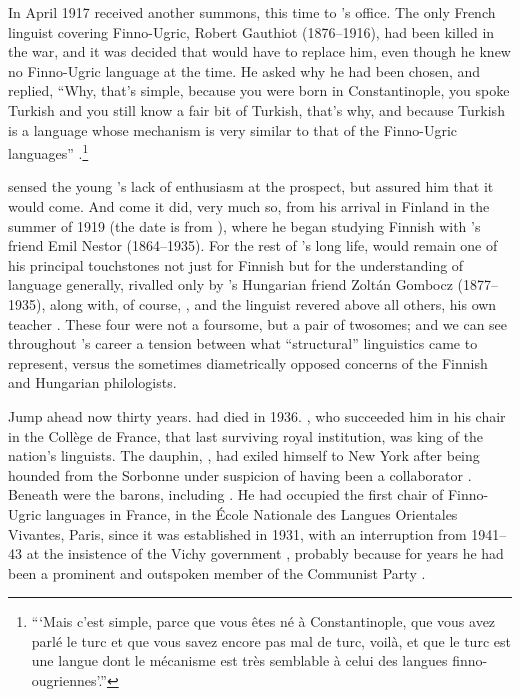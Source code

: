 \documentclass[output=paper]{langscibook}
\begin{document}
In April 1917 {\Sauvageot} received another summons, this time to {\Meillet}'s office. The only French linguist covering Finno-Ugric, Robert Gauthiot (1876--1916), had been killed in the war, and it was decided that {\Sauvageot} would have to replace him, even though he knew no Finno-Ugric language at the time. He asked why he had been chosen, and {\Meillet} replied, ``Why, that's simple, because you were born in Constantinople, you spoke Turkish and you still know a fair bit of Turkish, that's why, and because Turkish is a language whose mechanism is very similar to that of the Finno-Ugric languages'' \citep[194]{Sauvageot1992}.\footnote{```Mais c'est simple, parce que vous êtes né à Constantinople, que vous avez parlé le turc et que vous savez encore pas mal de turc, voilà, et que le turc est une langue dont le mécanisme est très semblable à celui des langues finno-ougriennes'.''}

{\Meillet} sensed the young {\Sauvageot}'s lack of enthusiasm at the prospect, but assured him that it would come. And come it did, very much so, from his arrival in Finland in the summer of 1919 (the date is from \citealt[296]{Perrot2007}), where he began studying Finnish with {\Meillet}'s friend Emil Nestor {} (1864--1935). For the rest of {\Sauvageot}'s long life, {} would remain one of his principal touchstones not just for Finnish but for the understanding of language generally, rivalled only by {}'s Hungarian friend Zoltán Gombocz (1877--1935), along with, of course, {\Meillet}, and the linguist {\Meillet} revered above all others, his own teacher {\Saussure}. These four were not a foursome, but a pair of twosomes; and we can see throughout {\Sauvageot}'s career a tension between what ``structural'' linguistics came to represent, versus the sometimes diametrically opposed concerns of the Finnish and Hungarian philologists.

Jump ahead now thirty years. {\Meillet} had died in 1936. {\Benveniste}, who succeeded him in his chair in the Collège de France, that last surviving royal institution, was king of the nation's linguists. The dauphin, {\Martinet}, had exiled himself to New York after being hounded from the Sorbonne under suspicion of having been a collaborator \citep[see][]{Joseph2016}. Beneath {\Benveniste} were the barons, including {\Sauvageot}. He had occupied the first chair of Finno-Ugric languages in France, in the École Nationale des Langues Orientales Vivantes, Paris, since it was established in 1931, with an interruption from 1941--43 at the insistence of the Vichy government \citep[296]{Perrot2007}, probably because for years he had been a prominent and outspoken member of the Communist Party \citep[see][158]{Chevalier2006}.
\end{document}

